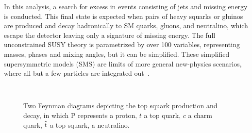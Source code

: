 In this analysis, a search for excess in events consisting of jets and 
missing energy is conducted. This final state is expected when pairs of
heavy squarks or gluinos are produced and decay hadronically to SM quarks,
gluons, and neutralino, which escape the detector leaving only a signature
of missing energy.
The full unconstrained SUSY theory is parametrized by over 100 variables, representing 
masses, phases and mixing angles, but it can be simplified. These simplified supersymmetric 
models (SMS) are limits of more general new-physics scenarios, where all but a few 
particles are integrated out~\cite{Alves:2011wf}.\\
\begin{figure}[ht!]
  \begin{center}
     \\
      \caption{Two Feynman diagrams depicting the top squark production
      and decay, in which P represents a proton, $t$ a top quark, $c$ a charm
      quark, $\tilde{\rm t}$ a top squark, \chiOnez a neutralino.}
    \label{fig:feynman_sms}
  \end{center}
\end{figure}

